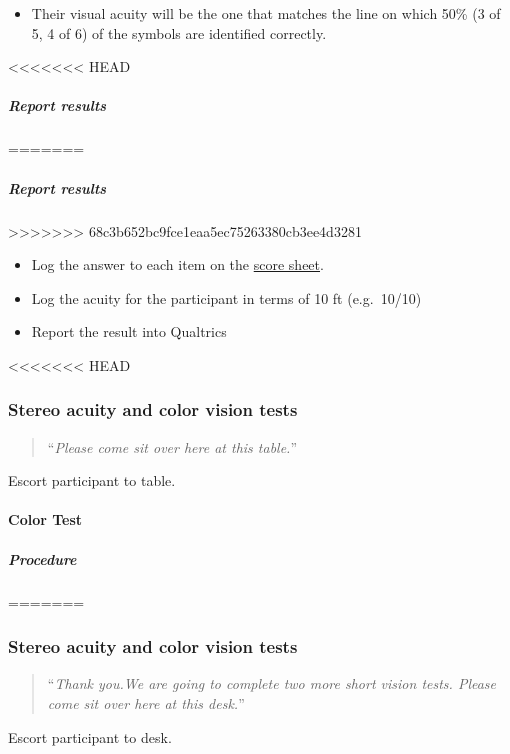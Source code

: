 \documentclass[]{article}
\providecommand{\tightlist}{%
  \setlength{\itemsep}{0pt}\setlength{\parskip}{0pt}}
\let\oldparagraph\paragraph
\renewcommand{\paragraph}[1]{\oldparagraph{#1}\mbox{}}
\let\oldsubparagraph\subparagraph
\renewcommand{\subparagraph}[1]{\oldsubparagraph{#1}\mbox{}}
\begin{document}
\begin{itemize}
\tightlist
\item
  Their visual acuity will be the one that matches the line on which
  50\% (3 of 5, 4 of 6) of the symbols are identified correctly.
\end{itemize}

<<<<<<< HEAD
\subparagraph{Report results}\label{report-results}
=======
\hypertarget{report-results}{%
\subparagraph{Report results}\label{report-results}}
>>>>>>> 68c3b652bc9fce1eaa5ec75263380cb3ee4d3281

\begin{itemize}
\tightlist
\item
  Log the answer to each item on the
  \href{vision-screening-score-sheet.html}{score sheet}.
\item
  Log the acuity for the participant in terms of 10 ft (e.g.~10/10)
\item
  Report the result into Qualtrics
\end{itemize}

<<<<<<< HEAD
\subsubsection{Stereo acuity and color vision
tests}\label{stereo-acuity-and-color-vision-tests}

\begin{quote}
``\emph{Please come sit over here at this table.}''
\end{quote}

Escort participant to table.

\paragraph{Color Test}\label{color-test}

\subparagraph{Procedure}\label{procedure-1}
=======
\hypertarget{stereo-acuity-and-color-vision-tests}{%
\subsubsection{Stereo acuity and color vision
tests}\label{stereo-acuity-and-color-vision-tests}}

\begin{quote}
``\emph{Thank you.We are going to complete two more short vision tests.
Please come sit over here at this desk.}''
\end{quote}

Escort participant to desk.
\end{document}
